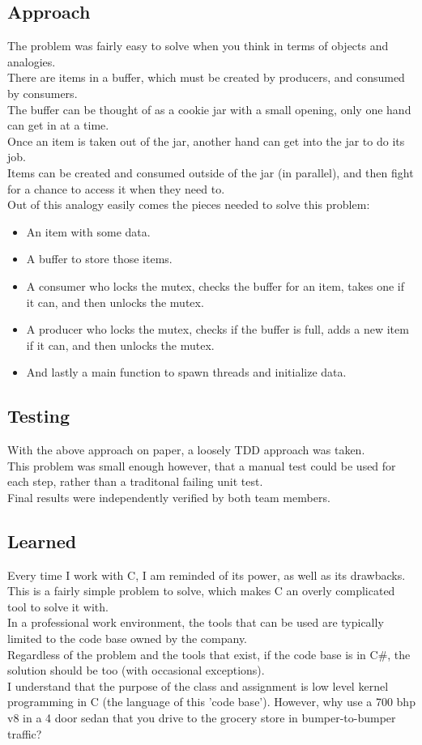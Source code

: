 \documentclass[letterpaper,10pt,fleqn]{article}
\begin{document}
	\subsection*{Approach}
	The problem was fairly easy to solve when you think in terms of objects and analogies.
	\\There are items in a buffer, which must be created by producers, and consumed by consumers.
	\\The buffer can be thought of as a cookie jar with a small opening, only one hand can get in at a time.
	\\Once an item is taken out of the jar, another hand can get into the jar to do its job.
	\\Items can be created and consumed outside of the jar (in parallel), and then fight for a chance to access it when they need to.
	\\Out of this analogy easily comes the pieces needed to solve this problem:
	\begin{itemize}
		\item An item with some data.
		\item A buffer to store those items.
		\item A consumer who locks the mutex, checks the buffer for an item, takes one if it can, and then unlocks the mutex.
		\item A producer who locks the mutex, checks if the buffer is full, adds a new item if it can, and then unlocks the mutex.
		\item And lastly a main function to spawn threads and initialize data.
	\end{itemize}
	\subsection*{Testing}
	With the above approach on paper, a loosely TDD approach was taken.
	\\This problem was small enough however, that a manual test could be used for each step, rather than a traditonal failing unit test.
	\\Final results were independently verified by both team members.
	\subsection*{Learned}
	Every time I work with C, I am reminded of its power, as well as its drawbacks.
	This is a fairly simple problem to solve, which makes C an overly complicated tool to solve it with.
	\\In a professional work environment, the tools that can be used are typically limited to the code base owned by the company.
	\\Regardless of the problem and the tools that exist, if the code base is in C\#, the solution should be too (with occasional exceptions).
	\\I understand that the purpose of the class and assignment is low level kernel programming in C (the language of this 'code base').
	However, why use a 700 bhp v8 in a 4 door sedan that you drive to the grocery store in bumper-to-bumper traffic?
\end{document}
